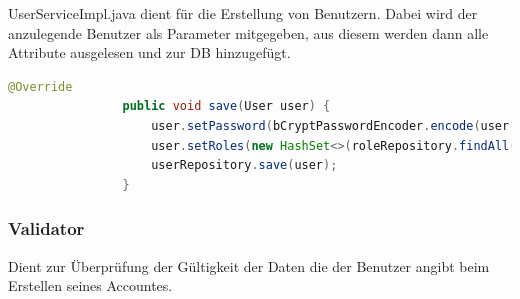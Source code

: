             UserServiceImpl.java dient für die Erstellung von Benutzern. Dabei wird der anzulegende Benutzer als Parameter mitgegeben, aus diesem werden dann alle Attribute ausgelesen und zur DB hinzugefügt. \\
            
            \newpage 
            
            \begin{lstlisting}[language = java]
                @Override 
                public void save(User user) {     
                    user.setPassword(bCryptPasswordEncoder.encode(user.getPasswod(); 
                    user.setRoles(new HashSet<>(roleRepository.findAll())); 
                    userRepository.save(user); 
                }  
            \end{lstlisting}
            
        \subsubsection{Validator}
            Dient zur Überprüfung der Gültigkeit der Daten die der Benutzer angibt beim Erstellen seines Accountes.
            
